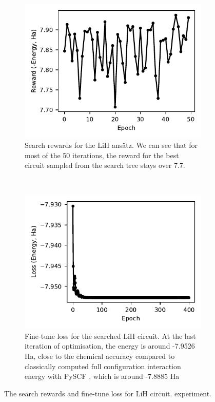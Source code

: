 \documentclass{ieeeaccess}
\begin{document}
\begin{figure}[t!]
    \centering
    \begin{subfigure}[t]{0.4\linewidth}
        \includegraphics[width=\linewidth]{peiyong_fig_11.pdf}
        \caption{Search rewards for the $\text{LiH}$ ans\"atz. We can see that for most of the 50 iterations, the reward for the best circuit sampled from the search tree stays over 7.7.}
        \label{fig:lih_search}
    \end{subfigure}
    ~ %
    \begin{subfigure}[t]{0.4\linewidth}
        \includegraphics[width=\linewidth]{peiyong_fig_12.pdf}
        \caption{Fine-tune loss for the searched $\text{LiH}$ circuit. At the last iteration of optimisation, the energy is around -7.9526 Ha, close to the chemical accuracy compared to classically computed full configuration interaction energy with PySCF \cite{Sun2018-nq, Sun2020-ej}, which is around -7.8885 Ha}
        \label{fig:lih_finetune}
    \end{subfigure}
    \caption{The search rewards and fine-tune loss for $\text{LiH}$ circuit. experiment.}\label{fig:lih_search_finetune}
\end{figure}
\end{document}
